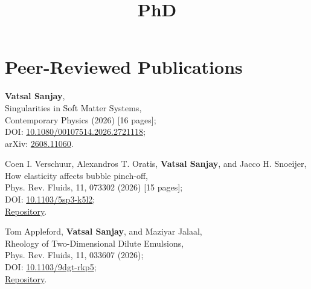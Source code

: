 \documentclass[10pt,a4paper,colorlinks,linkcolor=blue,urlcolor=blue,citecolor=blue]{moderncv}
\title{PhD}
\begin{document}
\makecvtitle

\section{Peer-Reviewed Publications}

\begin{enumerate}[leftmargin=1.5em,label=\textbf{[\arabic*]}]
	\item \textbf{Vatsal Sanjay},\\
	Singularities in Soft Matter Systems,\\
	Contemporary Physics (2026) [16 pages];\\
	\faFile\hspace{0.2em}DOI: \href{https://doi.org/10.1080/00107514.2026.2721118}{10.1080/00107514.2026.2721118};\\
	\faFile\hspace{0.2em}arXiv: \href{https://arxiv.org/abs/2608.11060}{2608.11060}.

	\item Coen I. Verschuur, Alexandros T. Oratis, \textbf{Vatsal Sanjay}, and Jacco H. Snoeijer,\\
	How elasticity affects bubble pinch-off,\\
	Phys. Rev. Fluids, 11, 073302 (2026) [15 pages];\\
	\faFile\hspace{0.2em}DOI: \href{https://doi.org/10.1103/5sp3-k5l2}{10.1103/5sp3-k5l2};\\
	\faGithub\hspace{0.2em}\href{https://github.com/comphy-lab/ElasticPinchOff}{Repository}.

	\item Tom Appleford, \textbf{Vatsal Sanjay}, and Maziyar Jalaal,\\
	Rheology of Two-Dimensional Dilute Emulsions,\\
	Phys. Rev. Fluids, 11, 033607 (2026);\\
	\faFile\hspace{0.2em}DOI: \href{https://doi.org/10.1103/9dgt-rkp5}{10.1103/9dgt-rkp5};\\
	\faGithub\hspace{0.2em}\href{https://github.com/tappleford/droplet_under_shear_newtonian_2D}{Repository}.


\end{enumerate}
\end{document}
